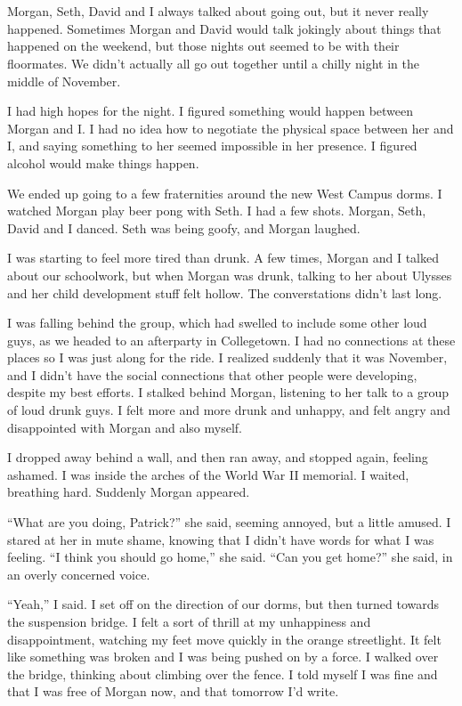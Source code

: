 \section{}

Morgan, Seth, David and I always talked about going out, but it never really
happened.  Sometimes Morgan and David would talk jokingly about things that
happened on the weekend, but those nights out seemed to be with their
floormates.  We didn't actually all go out together until a chilly night in the
middle of November.  

I had high hopes for the night.  I figured something would happen between Morgan
and I.  I had no idea how to negotiate the physical space between her and I, and
saying something to her seemed impossible in her presence.  I figured alcohol
would make things happen.

We ended up going to a few fraternities around the new West Campus dorms.  I
watched Morgan play beer pong with Seth.  I had a few shots.  Morgan, Seth,
David and I danced.  Seth was being goofy, and Morgan laughed.  

I was starting to feel more tired than drunk.  A few times, Morgan and I talked
about our schoolwork, but when Morgan was drunk, talking to her about Ulysses
and her child development stuff felt hollow.  The converstations didn't last
long.

I was falling behind the group, which had swelled to include some other loud
guys, as we headed to an afterparty in Collegetown.  I had no connections at
these places so I was just along for the ride.  I realized suddenly that it was
November, and I didn't have the social connections that other people were
developing, despite my best efforts.  I stalked behind Morgan, listening to her
talk to a group of loud drunk guys.  I felt more and more drunk and unhappy, and
felt angry and disappointed with Morgan and also myself.

I dropped away behind a wall, and then ran away, and stopped again, feeling
ashamed.   I was inside the arches of the World War II memorial.  I waited,
breathing hard.  Suddenly Morgan appeared.  

``What are you doing, Patrick?'' she said, seeming annoyed, but a little amused.
I stared at her in mute shame, knowing that I didn't have words for what I was
feeling.  ``I think you should go home,'' she said.  ``Can you get home?'' she
said, in an overly concerned voice.

``Yeah,'' I said.  I set off on the direction of our dorms, but then turned
towards the suspension bridge.  I felt a sort of thrill at my unhappiness and
disappointment, watching my feet move quickly in the orange streetlight.  It
felt like something was broken and I was being pushed on by a force.  I walked
over the bridge, thinking about climbing over the fence.  I told myself I was
fine and that I was free of Morgan now, and that tomorrow I'd write.

